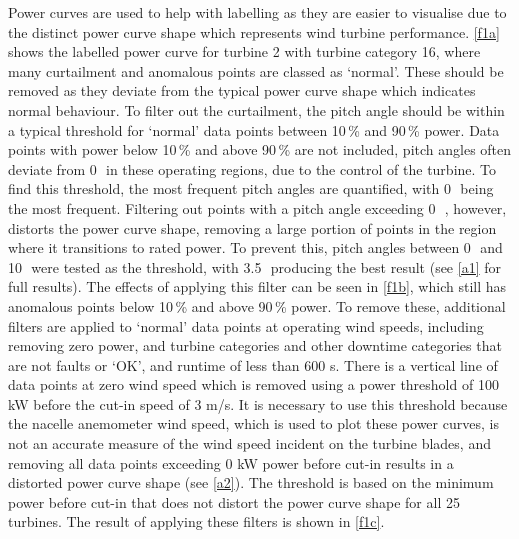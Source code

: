 Power curves are used to help with labelling as they are easier to visualise
due to the distinct power curve shape which represents wind turbine
performance. \autoref{f1a} shows the labelled power curve for turbine 2 with
turbine category 16, where many curtailment and anomalous points are classed
as `normal'. These should be removed as they deviate from the typical power
curve shape which indicates normal behaviour. To filter out the curtailment,
the pitch angle should be within a typical threshold for `normal' data points
between 10\,\% and 90\,\% power. Data points with power below 10\,\% and above
90\,\% are not included, pitch angles often deviate from 0\,\textdegree\ in
these operating regions, due to the control of the turbine. To find this
threshold, the most frequent pitch angles are quantified, with 0\,\textdegree\
being the most frequent. Filtering out points with a pitch angle exceeding
0\,\textdegree~, however, distorts the power curve shape, removing a large
portion of points in the region where it transitions to rated power. To
prevent this, pitch angles between 0\,\textdegree\ and 10\,\textdegree\ were
tested as the threshold, with 3.5\,\textdegree\ producing the best result (see
\autoref{a1} for full results). The effects of applying this filter can be
seen in \autoref{f1b}, which still has anomalous points below 10\,\% and above
90\,\% power. To remove these, additional filters are applied to `normal' data
points at operating wind speeds, including removing zero power, and turbine
categories and other downtime categories that are not faults or `OK', and
runtime of less than 600 s. There is a vertical line of data points at zero
wind speed which is removed using a power threshold of 100 kW before the
cut-in speed of 3 m/s. It is necessary to use this threshold because the
nacelle anemometer wind speed, which is used to plot these power curves, is
not an accurate measure of the wind speed incident on the turbine blades, and
removing all data points exceeding 0 kW power before cut-in results in a
distorted power curve shape (see \autoref{a2}). The threshold is based on the
minimum power before cut-in that does not distort the power curve shape for
all 25 turbines. The result of applying these filters is shown in
\autoref{f1c}.

